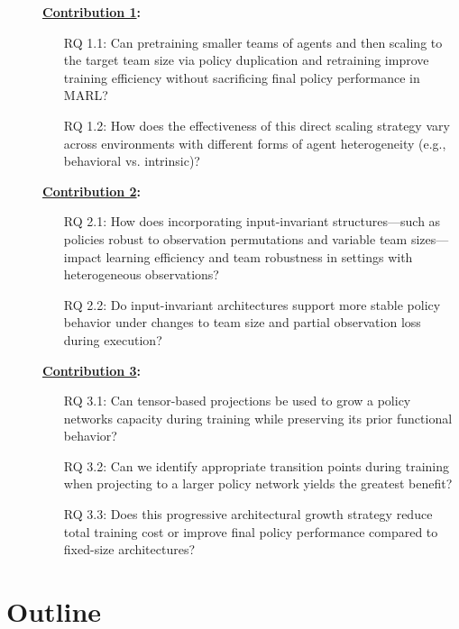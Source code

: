 \begin{description}
    \item[] \textbf{\hyperref[ch:contribution_1]{Contribution 1}:}
    \begin{itemize}
        \item[RQ 1.1:] Can pretraining smaller teams of agents and then scaling to the target 
        team size via policy duplication and retraining improve training efficiency 
        without sacrificing final policy performance in MARL?
        \item[RQ 1.2:] How does the effectiveness of this direct scaling strategy vary across 
        environments with different forms of agent heterogeneity 
        (e.g., behavioral vs. intrinsic)?
    \end{itemize}
    \item[] \textbf{\hyperref[ch:contribution_2]{Contribution 2}:}
    \begin{itemize}
        \item[RQ 2.1:] How does incorporating input-invariant structures—such as policies 
        robust to observation permutations and variable team sizes—impact learning efficiency 
        and team robustness in settings with heterogeneous observations?
        \item[RQ 2.2:] Do input-invariant architectures support more stable policy behavior 
        under changes to team size and partial observation loss during execution?
    \end{itemize}
    \item[] \textbf{\hyperref[ch:contribution_3]{Contribution 3}:}
    \begin{itemize}
        \item[RQ 3.1:] Can tensor-based projections be used to grow a policy networks 
        capacity during training while preserving its prior functional behavior?
        \item[RQ 3.2:] Can we identify appropriate transition points during training when projecting 
        to a larger policy network yields the greatest benefit?
        \item[RQ 3.3:] Does this progressive architectural growth strategy reduce total training cost 
        or improve final policy performance compared to fixed-size architectures?
    \end{itemize}
\end{description}


\section{Outline}%

